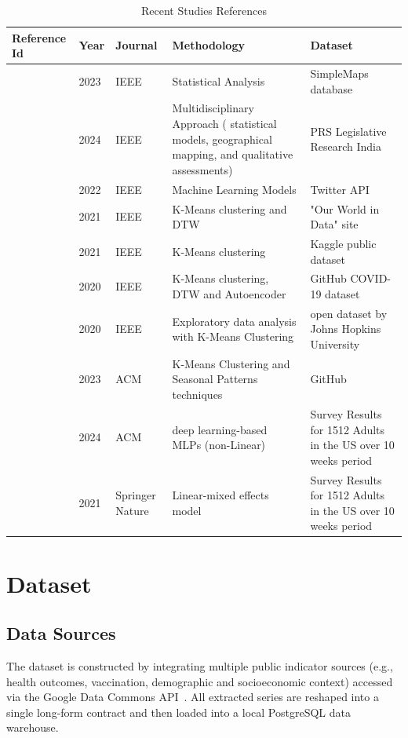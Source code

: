 \documentclass[a4paper]{report}
\begin{document}
\begin{table}[h!]
    \centering
    \caption{Recent Studies References}
    \label{tab:my_table}
    \begin{tabular}{|p{2cm}|p{2cm}|p{2cm}|p{5cm}|p{2cm}|}
        \hline
        Reference Id & Year & Journal & Methodology & Dataset \\
        \hline
        ~\cite{10487417} & 2023 & IEEE & Statistical Analysis & SimpleMaps database \\
        \hline
        ~\cite{10840438} & 2024 & IEEE & Multidisciplinary Approach (
statistical models, geographical mapping, and qualitative
assessments) & PRS Legislative Research India \\
        \hline
        ~\cite{9811166} & 2022 & IEEE & Machine Learning Models & Twitter API \\
        \hline
        ~\cite{9455073} & 2021 & IEEE & K-Means clustering and DTW & "Our World in Data" site \\
        \hline
        ~\cite{9795511} & 2021 & IEEE & K-Means clustering & Kaggle public dataset \\
        \hline
        ~\cite{9457942} & 2020 & IEEE & K-Means clustering, DTW and Autoencoder & GitHub COVID-19 dataset \\
        \hline
        ~\cite{9358331} & 2020 & IEEE & Exploratory data analysis with K-Means Clustering & open dataset by Johns Hopkins University \\
        \hline
         
        ~\cite{tangprasert2023forecasting} & 2023 & ACM & K-Means Clustering and Seasonal Patterns techniques & GitHub \\
        \hline
          ~\cite{fong2024predicting} & 2024 & ACM & deep learning-based MLPs (non-Linear) & Survey Results for 1512 Adults in the US over 10 weeks period \\
        \hline
         ~\cite{shuster2021emotional} & 2021 & Springer Nature & Linear-mixed effects model & Survey Results for 1512 Adults in the US over 10 weeks period \\
        \hline
        
    \end{tabular}
\end{table}

\chapter{Dataset}\label{ch3:dataset}
\section{Data Sources}
The dataset is constructed by integrating multiple public indicator sources (e.g., health outcomes, vaccination, demographic and socioeconomic context) accessed via the Google Data Commons API~\cite{google_datacommons_api}.
All extracted series are reshaped into a single long-form contract and then loaded into a local PostgreSQL data warehouse.
\end{document}
